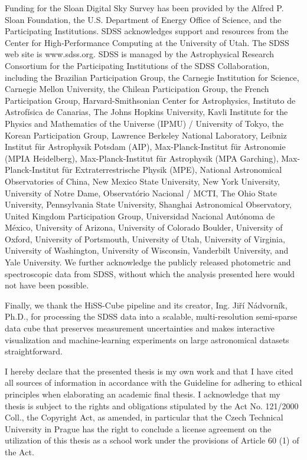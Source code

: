 \documentclass[english,bachelor,oneside]{ctufit-thesis}
\begin{document}
\begin{acknowledgmentpage}
    Funding for the Sloan Digital Sky Survey has been provided by the Alfred P. Sloan Foundation, the U.S. Department of Energy Office of Science, and the Participating Institutions. SDSS acknowledges support and resources from the Center for High-Performance Computing at the University of Utah. The SDSS web site is www.sdss.org. SDSS is managed by the Astrophysical Research Consortium for the Participating Institutions of the SDSS Collaboration, including the Brazilian Participation Group, the Carnegie Institution for Science, Carnegie Mellon University, the Chilean Participation Group, the French Participation Group, Harvard-Smithsonian Center for Astrophysics, Instituto de Astrofísica de Canarias, The Johns Hopkins University, Kavli Institute for the Physics and Mathematics of the Universe (IPMU) / University of Tokyo, the Korean Participation Group, Lawrence Berkeley National Laboratory, Leibniz Institut für Astrophysik Potsdam (AIP), Max-Planck-Institut für Astronomie (MPIA Heidelberg), Max-Planck-Institut für Astrophysik (MPA Garching), Max-Planck-Institut für Extraterrestrische Physik (MPE), National Astronomical Observatories of China, New Mexico State University, New York University, University of Notre Dame, Observatório Nacional / MCTI, The Ohio State University, Pennsylvania State University, Shanghai Astronomical Observatory, United Kingdom Participation Group, Universidad Nacional Autónoma de México, University of Arizona, University of Colorado Boulder, University of Oxford, University of Portsmouth, University of Utah, University of Virginia, University of Washington, University of Wisconsin, Vanderbilt University, and Yale University.
    We further acknowledge the publicly released photometric and spectroscopic data from SDSS, without which the analysis presented here would not have been possible.

    Finally, we thank the HiSS-Cube pipeline and its creator, Ing. Jiří Nádvorník, Ph.D., for processing the SDSS data into a scalable, multi-resolution semi-sparse data cube that preserves measurement uncertainties and makes interactive visualization and machine-learning experiments on large astronomical datasets straightforward.
    
\end{acknowledgmentpage}

\begin{declarationpage}
I hereby declare that the presented thesis is my own work and that I have cited all
sources of information in accordance with the Guideline for adhering to ethical
principles when elaborating an academic final thesis.
I acknowledge that my thesis is subject to the rights and obligations stipulated by the
Act No. 121/2000 Coll., the Copyright Act, as amended, in particular that the Czech
Technical University in Prague has the right to conclude a license agreement on the
utilization of this thesis as a school work under the provisions of Article 60 (1) of the
Act.
\end{declarationpage}
\end{document}
